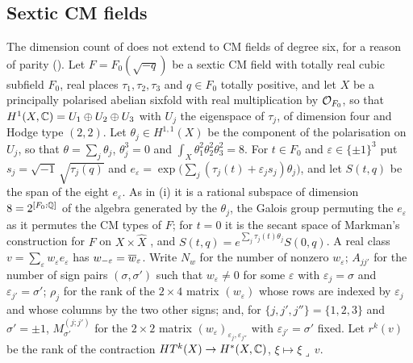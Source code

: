 \subsection{Sextic CM fields}\label{ssec:sextic}

The dimension count of  does not extend to CM
fields of degree six, for a reason of parity (). Let
$F=F_{0}(\sqrt{-q})$ be a sextic CM field with totally
real cubic subfield $F_{0}$, real places $\tau_{1},\tau_{2},\tau_{3}$ and $q\in
F_{0}$ totally positive, and let $X$ be a principally polarised abelian sixfold
with real multiplication by $\mathcal{O}_{F_{0}}$, so that
$H^{1}(X,\mathbb{C})=U_{1}\oplus U_{2}\oplus U_{3}$ with $U_{j}$ the eigenspace of
$\tau_{j}$, of dimension four and Hodge type $(2,2)$. Let
$\theta_{j}\in H^{1,1}(X)$ be the component of the polarisation on $U_{j}$, so
that $\theta=\sum_{j}\theta_{j}$, $\theta_{j}^{3}=0$ and
$\int_{X}\theta_{1}^{2}\theta_{2}^{2}\theta_{3}^{2}=8$. For $t\in F_{0}$ and
$\varepsilon\in\{\pm1\}^{3}$ put $s_{j}=\sqrt{-1}\,\sqrt{\tau_{j}(q)}$ and
$e_{\varepsilon}=\exp\bigl(\sum_{j}(\tau_{j}(t)+\varepsilon_{j}s_{j})\theta_{j}\bigr)$,
and let $S(t,q)$ be the span of the eight $e_{\varepsilon}$. As in
(i) it is a rational subspace of dimension
$8=2^{[F_{0}:\mathbb{Q}]}$ of the algebra generated by the $\theta_{j}$, the Galois
group permuting the $e_{\varepsilon}$ as it permutes the CM types of $F$; for
$t=0$ it is the secant space of Markman's construction for $F$ on
$X\times\widehat{X}$ \cite[\S11.1]{Mar25c}, and
$S(t,q)=e^{\sum_{j}\tau_{j}(t)\theta_{j}}S(0,q)$. A real class
$v=\sum_{\varepsilon}w_{\varepsilon}e_{\varepsilon}$ has
$w_{-\varepsilon}=\overline{w}_{\varepsilon}$. Write $N_{w}$ for the number of
nonzero $w_{\varepsilon}$; $A_{jj'}$ for the number of sign pairs
$(\sigma,\sigma')$ such that $w_{\varepsilon}\ne0$ for some $\varepsilon$ with
$\varepsilon_{j}=\sigma$ and $\varepsilon_{j'}=\sigma'$; $\rho_{j}$ for the rank
of the $2\times4$ matrix $(w_{\varepsilon})$ whose rows are indexed by
$\varepsilon_{j}$ and whose columns by the two other signs; and, for
$\{j,j',j''\}=\{1,2,3\}$ and $\sigma'=\pm1$, $M^{(j;j')}_{\sigma'}$ for the
$2\times2$ matrix $(w_{\varepsilon})_{\varepsilon_{j},\varepsilon_{j''}}$ with
$\varepsilon_{j'}=\sigma'$ fixed. Let $r^{k}(v)$ be the rank of the contraction
$HT^{k}(X)\to H^{*}(X,\mathbb{C})$, $\xi\mapsto\xi\lrcorner\,v$.


